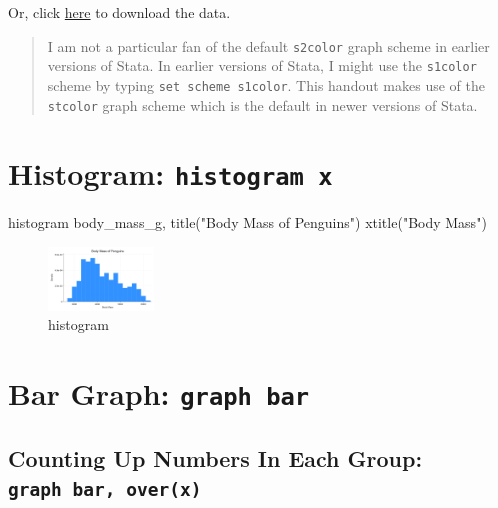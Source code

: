 \documentclass[
  letterpaper,
  DIV=11,
  numbers=noendperiod]{scrartcl}
\newenvironment{Shaded}{\begin{snugshade}}{\end{snugshade}}
\newcommand{\BaseNTok}[1]{\textcolor[rgb]{0.68,0.00,0.00}{#1}}
\newcommand{\KeywordTok}[1]{\textcolor[rgb]{0.00,0.23,0.31}{#1}}
\newcommand{\NormalTok}[1]{\textcolor[rgb]{0.00,0.23,0.31}{#1}}
\newcommand{\StringTok}[1]{\textcolor[rgb]{0.13,0.47,0.30}{#1}}
\begin{document}
Or, click
\href{https://github.com/agrogan1/Stata/raw/master/data-visualization-with-Stata-the-basics/penguins.dta}{here}
to download the data.

\begin{quote}
I am not a particular fan of the default \texttt{s2color} graph scheme
in earlier versions of Stata. In earlier versions of Stata, I might use
the \texttt{s1color} scheme by typing \texttt{set\ scheme\ s1color}.
This handout makes use of the \texttt{stcolor} graph scheme which is the
default in newer versions of Stata.
\end{quote}

\section{\texorpdfstring{Histogram:
\texttt{histogram\ x}}{Histogram: histogram x}}\label{histogram-histogram-x}

\begin{Shaded}
\begin{Highlighting}[]
\KeywordTok{histogram}\NormalTok{ body\_mass\_g, }\BaseNTok{title}\NormalTok{(}\StringTok{"Body Mass of Penguins"}\NormalTok{) }\BaseNTok{xtitle}\NormalTok{(}\StringTok{"Body Mass"}\NormalTok{)}
\end{Highlighting}
\end{Shaded}

\begin{figure}[H]

{\centering \includegraphics[width=0.25\textwidth,height=\textheight]{myhistogram.png}

}

\caption{histogram}

\end{figure}%

\section{\texorpdfstring{Bar Graph:
\texttt{graph\ bar}}{Bar Graph: graph bar}}\label{bar-graph-graph-bar}

\subsection{\texorpdfstring{Counting Up Numbers In Each Group:
\texttt{graph\ bar,\ over(x)}}{Counting Up Numbers In Each Group: graph bar, over(x)}}\label{counting-up-numbers-in-each-group-graph-bar-overx}
\end{document}
